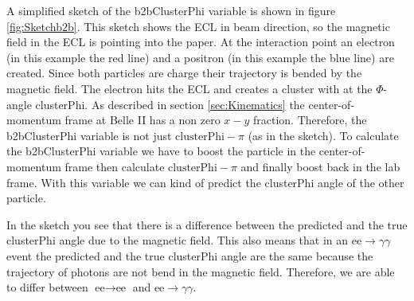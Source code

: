 \documentclass[a4paper,11pt,twosided,final,german,openbib,pdftex,listof=totoc,bibliography=totoc]{scrbook}
\begin{document}
A simplified sketch of the b2bClusterPhi variable is shown in figure \ref{fig:Sketchb2b}. This sketch shows the ECL in beam direction, so the magnetic field in the ECL is pointing into the paper. At the interaction point an electron (in this example the red line) and a positron (in this example the blue line) are created. Since both particles are charge their trajectory is bended by the magnetic field. The electron hits the ECL and creates a cluster with at the $\Phi$-angle clusterPhi. As described in section \ref{sec:Kinematics} the center-of-momentum frame at Belle II has a non zero $x-y$ fraction. Therefore, the b2bClusterPhi variable is not just $\textrm{clusterPhi} - \pi$ (as in the sketch). To calculate the b2bClusterPhi variable we have to boost the particle in the center-of-momentum frame then calculate $\textrm{clusterPhi} - \pi$ and finally boost back in the lab frame. With this variable we can kind of predict the clusterPhi angle of the other particle. 

In the sketch you see that there is a difference between the predicted and the true clusterPhi angle due to the magnetic field. This also means that in an $\textrm{ee} \rightarrow \gamma \gamma$ event the predicted and the true clusterPhi angle are the same because the trajectory of photons are not bend in the magnetic field. Therefore, we are able to differ between $\textrm{ee} \rightarrow \textrm{ee}$ and $\textrm{ee} \rightarrow \gamma \gamma$.
\end{document}
